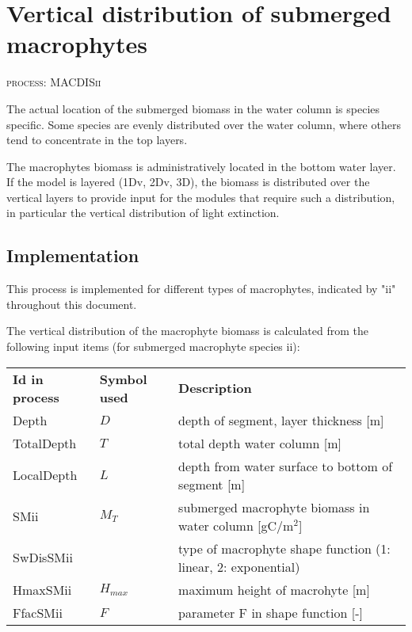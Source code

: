 \section{Vertical distribution of submerged macrophytes}
\begin{flushright}
\textsc{process: MACDISii}
\end{flushright}

The actual location of the submerged biomass in the water column is species specific. Some species are evenly
distributed over the water column, where others tend to concentrate in the top layers.

The macrophytes biomass is administratively located in the bottom water layer. If the model is layered
(1Dv, 2Dv, 3D), the biomass is distributed over the vertical layers to
provide input for the modules that require such a distribution, in particular the vertical distribution of light
extinction.

\subsection{Implementation}

This process is implemented for different types of macrophytes, indicated by "ii" throughout this document.

The vertical distribution of the macrophyte biomass is calculated from the following input items
(for submerged macrophyte species ii):

\begin{tabular}{lll}
\textbf{Id in process} & \textbf{Symbol used} & \textbf{Description}                                             \\ [1ex]
Depth                & $D$                & depth of segment, layer thickness [m]                          \\
TotalDepth           & $T$                & total depth water column [m]                                   \\
LocalDepth           & $L$                & depth from water surface to bottom of segment [m]              \\
SMii                 & $M_T$              & submerged macrophyte biomass in water column [gC/m$^2$]        \\
SwDisSMii            &                    & type of macrophyte shape function (1: linear, 2: exponential)  \\
HmaxSMii             & $H_{max}$          & maximum height of macrohyte [m]                                \\
FfacSMii             & $F$                & parameter F in shape function [-]                              \\
\end{tabular}

